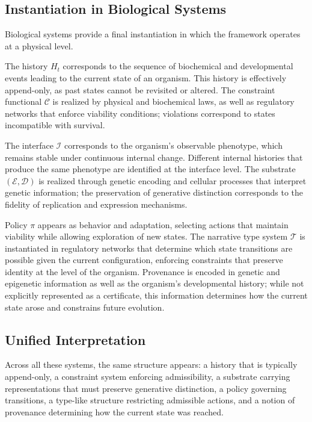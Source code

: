 \documentclass[12pt, a4paper]{article}
\theoremstyle{plain}
\theoremstyle{definition}
\theoremstyle{remark}
\begin{document}
\subsection{Instantiation in Biological Systems}

Biological systems provide a final instantiation in which the framework operates at a physical level.

The history $H_t$ corresponds to the sequence of biochemical and developmental events leading to the current state of an organism. This history is effectively append-only, as past states cannot be revisited or altered. The constraint functional $\mathcal{C}$ is realized by physical and biochemical laws, as well as regulatory networks that enforce viability conditions; violations correspond to states incompatible with survival.

The interface $\mathcal{I}$ corresponds to the organism's observable phenotype, which remains stable under continuous internal change. Different internal histories that produce the same phenotype are identified at the interface level. The substrate $(\mathcal{E}, \mathcal{D})$ is realized through genetic encoding and cellular processes that interpret genetic information; the preservation of generative distinction corresponds to the fidelity of replication and expression mechanisms.

Policy $\pi$ appears as behavior and adaptation, selecting actions that maintain viability while allowing exploration of new states. The narrative type system $\mathcal{T}$ is instantiated in regulatory networks that determine which state transitions are possible given the current configuration, enforcing constraints that preserve identity at the level of the organism. Provenance is encoded in genetic and epigenetic information as well as the organism's developmental history; while not explicitly represented as a certificate, this information determines how the current state arose and constrains future evolution.

\subsection{Unified Interpretation}

Across all these systems, the same structure appears: a history that is typically append-only, a constraint system enforcing admissibility, a substrate carrying representations that must preserve generative distinction, a policy governing transitions, a type-like structure restricting admissible actions, and a notion of provenance determining how the current state was reached.
\end{document}
